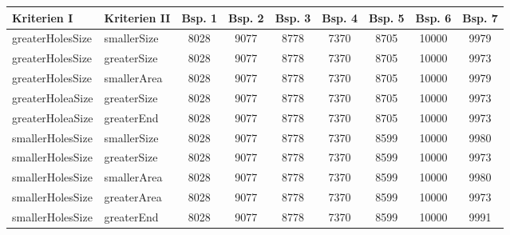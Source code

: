 \begin{table}[h]
\centering
\begin{tabular}{|>{\ttfamily}l|>{\ttfamily}l|c|c|c|c|c|c|c|}
\hline
\textnormal{Kriterien I} & \textnormal{Kriterien II} & Bsp. 1 & Bsp. 2 & Bsp. 3 & Bsp. 4 & Bsp. 5 & Bsp. 6 & Bsp. 7 \\
\hline
greaterHolesSize & smallerSize & 8028 & 9077 & 8778 & 7370 & 8705 & 10000 & 9979 \\
\hline
greaterHolesSize & greaterSize & 8028 & 9077 & 8778 & 7370 & 8705 & 10000 & 9973 \\
\hline
greaterHolesSize & smallerArea & 8028 & 9077 & 8778 & 7370 & 8705 & 10000 & 9979 \\
\hline
greaterHoleaSize & greaterSize & 8028 & 9077 & 8778 & 7370 & 8705 & 10000 & 9973 \\
\hline
greaterHoleaSize & greaterEnd & 8028 & 9077 & 8778 & 7370 & 8705 & 10000 & 9973 \\
\hline
smallerHolesSize & smallerSize & 8028 & 9077 & 8778 & 7370 & 8599 & 10000 & 9980 \\
\hline
smallerHolesSize & greaterSize & 8028 & 9077 & 8778 & 7370 & 8599 & 10000 & 9973 \\
\hline
smallerHolesSize & smallerArea & 8028 & 9077 & 8778 & 7370 & 8599 & 10000 & 9980 \\
\hline
smallerHolesSize & greaterArea & 8028 & 9077 & 8778 & 7370 & 8599 & 10000 & 9973 \\
\hline
smallerHolesSize & greaterEnd & 8028 & 9077 & 8778 & 7370 & 8599 & 10000 & 9991 \\
\hline
\end{tabular}
\end{table}

